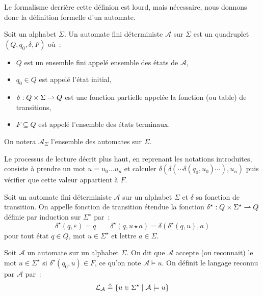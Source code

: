 Le formalisme derrière cette définion est lourd, mais nécessaire, nous donnons
donc la définition formelle d'un automate.

\begin{definition}
  Soit un alphabet $\Sigma$. Un automate fini déterministe $\mathcal A$ sur
  $\Sigma$ est un quadruplet $(Q,q_0,\delta,F)$ où~:
  \begin{itemize}
  \item $Q$ est un ensemble fini appelé ensemble des états de $\mathcal A$,
  \item $q_0 \in Q$ est appelé l'état initial,
  \item $\delta : Q\times \Sigma \rightharpoonup Q$ est une fonction partielle
    appelée la fonction (ou table) de transitions,
  \item $F \subseteq Q$ est appelé l'ensemble des états terminaux.
  \end{itemize}

  On notera $\mathcal A_\Sigma$ l'ensemble des automates sur $\Sigma$.
\end{definition}

Le processus de lecture décrit plus haut, en reprenant les notations
introduites, consiste à prendre un mot $u = u_0\ldots u_n$ et calculer
$\delta(\delta(\cdots\delta(q_0,u_0)\cdots),u_n)$ puis vérifier que cette
valeur appartient à $F$.

\begin{definition}
  Soit un automate fini déterministe $\mathcal A$ sur un alphabet $\Sigma$ et
  $\delta$ sa fonction de transition. On appelle fonction de transition
  étendue la fonction $\delta^\star : Q \times \Sigma^\star \rightharpoonup Q$ définie
  par induction sur $\Sigma^\star$ par~:
  \[\delta^\star (q,\varepsilon) = q \qquad
  \delta^\star (q,u\star a) = \delta(\delta^\star(q,u),a)\]
  pour tout état $q \in Q$, mot $u \in \Sigma^\star$ et lettre $a \in \Sigma$.
\end{definition}

\begin{definition}
  Soit $\mathcal A$ un automate sur un alphabet $\Sigma$. On dit que
  $\mathcal A$ accepte (ou reconnait) le mot $u \in \Sigma^\star$ si
  $\delta^\star(q_0,u) \in F$, ce qu'on note $\mathcal A \models u$. On définit
  le langage reconnu par $\mathcal A$ par~:
  \[\mathcal L_\mathcal A \triangleq \{u \in \Sigma^\star
  \mid \mathcal A \models u\}\]
\end{definition}

